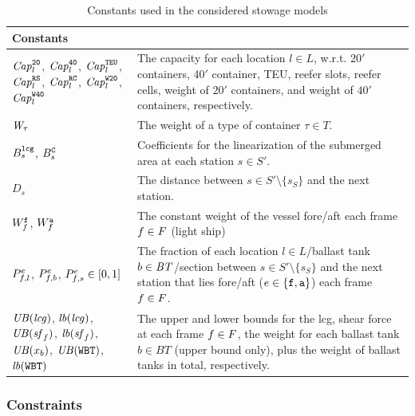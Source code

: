 \begin{table}[p]
\centering
\begin{tabular}{p{4.5cm}p{8cm}}%
\multicolumn{2}{l}{\textbf{Constants}}\\
\hline\noalign{\smallskip}
$\mathit{Cap}_l^{\texttt{20}}$, $\mathit{Cap}_l^{\texttt{40}}$, $\mathit{Cap}_l^{\texttt{TEU}}$, $\mathit{Cap}_l^{\texttt{RS}}$, $\mathit{Cap}_l^{\texttt{RC}}$, 
$\mathit{Cap}_l^{\texttt{W20}}$, $\mathit{Cap}_l^{\texttt{W40}}$
		& The capacity for each location $l\in L$, w.r.t. $20'$ containers, $40'$ container, TEU, reefer slots, reefer cells, weight of $20'$ containers, and weight of $40'$ containers, respectively.\\
$\mathit{W}_\tau$
		&The weight of a type of container $\tau\in T$.\\
$B^{\texttt{lcg}}_s$, $B^{\texttt{C}}_s$
		&{Coefficients for the linearization of the submerged area at each station $s\in S'$.}\\
$D_s$ &
		The distance between $s\in S'\setminus\{s_S\}$ and the next station.\\
$W^{\texttt{f}}_f$, $W^{\texttt{a}}_f$
		&{The constant weight of the vessel fore/aft each frame $f\in F$ (light ship)}\\
$P^{e}_{f,l}$, $P^{e}_{f,b}$, $P^{e}_{f,s}\in [0,1]$
		& The fraction of each location $l\in L$/ballast tank $b\in \mathit{BT}$/section between $s\in S'\setminus\{s_S\}$ and the next station that lies fore/aft (${e}\in\{\texttt{f},\texttt{a}\}$) each frame $f\in F$.\\
$\mathit{UB}(\mathit{lcg})$, $\mathit{lb}(\mathit{lcg})$,\newline $\mathit{UB}(\mathit{sf}_f)$, $\mathit{lb}(\mathit{sf}_f)$,\newline 
 $\mathit{UB}(x_b)$, $\mathit{UB}(\texttt{WBT})$,\newline $\mathit{lb}(\texttt{WBT})$
		&The upper and lower bounds for the lcg, shear force at each frame $f\in F$, the weight for each ballast tank $b\in BT$ (upper bound only), plus 
		the weight of ballast tanks in total, respectively.\\
\end{tabular}
\caption{Constants used in the considered stowage models}\label{table:constants}
\end{table}
%
\subsubsection*{Constraints}
